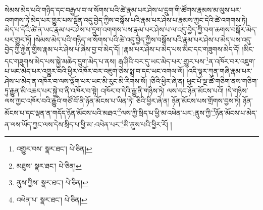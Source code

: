 སེམས་མེད་པའི་གཉིད་དང་བརྒྱལ་བ་ལ་སོགས་པའི་ཚེ་རྣམ་པར་ཤེས་པ་དྲུག་གི་ཚོགས་རྣམས་མ་ལུས་པར་འགགས་ཏེ་མེད་པར་གྱུར་པས་སྔོན་འདུ་བྱེད་ཀྱིས་བསྒོས་པའི་རྣམ་པར་ཤེས་པ་རྣམས་ཀྱང་དེའི་ཚེ་འགགས་ཏེ། མེད་པ་དེའི་ཚེ་ན་ཡང་རྣམ་པར་ཤེས་པ་དྲུག་འགགས་པས་རྣམ་པར་ཤེས་པ་ལ་འདུ་བྱེད་ཀྱི་བག་ཆགས་བསྒོར་མེད་པར་གྱུར་ཏོ། །སེམས་མེད་པའི་གཉིད་ལ་སོགས་པའི་ཚེ་འདུ་བྱེད་ཀྱིས་བསྒོས་པའི་རྣམ་པར་ཤེས་པ་མེད་པས་འདུ་བྱེད་ཀྱི་རྐྱེན་གྱིས་རྣམ་པར་ཤེས་པ་ཞེས་བྱ་བ་མེད་དོ། །རྣམ་པར་ཤེས་པ་མེད་པས་མིང་དང་གཟུགས་མེད་དོ། །མིང་དང་གཟུགས་མེད་པས་སྐྱེ་མཆེད་དྲུག་མེད་པ་ནས། རྒ་ཤིའི་བར་དུ་ཡང་མེད་པར་:གྱུར་པས་\footnote{འགྱུར་བས་  སྣར་ཐང་།  པེ་ཅིན། }ན་འཁོར་བར་འཇུག་པ་ཡང་མེད་པར་འགྱུར་བའི་ཕྱིར་འཁོར་བར་འཇུག་ཅེས་སྨྲ་བ་དང་ཡང་འགལ་ལོ། །འདི་ལྟར་ཀུན་གཞི་རྣམ་པར་ཤེས་པ་མེད་ན་འཁོར་བ་ལས་ལྡོག་པར་ཡང་མི་རུང་མི་རིགས་སོ། །ཅིའི་ཕྱིར་ཞེ་ན། ཕུང་པོ་ལྔ་ཚེ་གཅིག་ནས་གཅིག་ཏུ་རྒྱུན་མི་འཆད་པར་སྐྱེ་བ་ནི་འཁོར་བ་སྟེ། འཁོར་བ་དེའི་རྒྱུ་ནི་གཉིས་ཏེ། ལས་དང་ཉོན་མོངས་པའོ། །དེ་གཉིས་ལས་ཀྱང་འཁོར་བའི་རྒྱུའི་གཙོ་བོ་ནི་ཉོན་མོངས་པ་ཡིན་ཏེ། ཅིའི་ཕྱིར་ཞེ་ན། ཉོན་མོངས་པས་གྲོགས་བྱས་ཏེ། ཉོན་མོངས་པ་དང་ལྡན་ན་གདོད་ཉོན་མོངས་པའི་མཐའ་\footnote{མཐུས་  སྣར་ཐང་།  པེ་ཅིན། }ལས་ཀྱི་སྲིད་པ་ཕྱི་མ་འཕེན་པར་:ནུས་ཀྱི་\footnote{ནུས་ཀྱིས་  སྣར་ཐང་།  པེ་ཅིན། }ཉོན་མོངས་པ་མེད་ན་ལས་ཡོད་ཀྱང་ལས་དེས་སྲིད་པ་ཕྱི་མ་:འཕེན་པར་\footnote{འཕེན་པ་  སྣར་ཐང་།  པེ་ཅིན། }མི་ནུས་པའི་ཕྱིར་རོ། །
